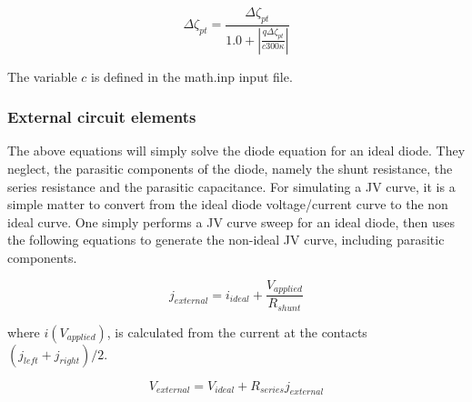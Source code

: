\documentclass[11pt]{article}
\begin{document}
\begin{equation}
\Delta \zeta_{pt}=\frac{\Delta \zeta_{pt}}{1.0+|\frac{q \Delta \zeta_{pt}}{c300\kappa}|}
\end{equation}

The variable $c$ is defined in the math.inp input file.

\subsubsection{External circuit elements}
The above equations will simply solve the diode equation for an ideal diode.  They neglect, the parasitic components of the diode, namely the shunt resistance, the series resistance and the parasitic capacitance.   For simulating a JV curve, it is a simple matter to convert from the ideal diode voltage/current curve to the non ideal curve.  One simply performs a JV curve sweep for an ideal diode, then uses the following equations to generate the non-ideal JV curve, including parasitic components.

\begin{equation}
j_{external}=i_{ideal}+\frac{V_{applied}}{R_{shunt}}
\end{equation}

where $i(V_{applied})$, is calculated from the current at the contacts $(j_{left}+j_{right})/2$.

\begin{equation}
V_{external}=V_{ideal}+R_{series}j_{external}
\end{equation}
\end{document}
